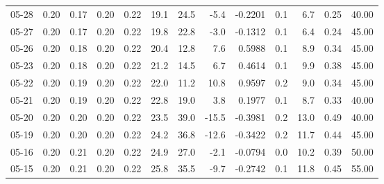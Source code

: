\begin{threeparttable}
{\begin{tabular}{lrrrrrrrrrrrr}
  05-28 &          0.20 &          0.17 &          0.20 &        0.22 &                19.1 &                24.5 &       -5.4 &      -0.2201 &                 0.1 &              6.7 &            0.25 &                  40.00 \\
  05-27 &          0.20 &          0.17 &          0.20 &        0.22 &                19.8 &                22.8 &       -3.0 &      -0.1312 &                 0.1 &              6.4 &            0.24 &                  45.00 \\
  05-26 &          0.20 &          0.18 &          0.20 &        0.22 &                20.4 &                12.8 &        7.6 &       0.5988 &                 0.1 &              8.9 &            0.34 &                  45.00 \\
  05-23 &          0.20 &          0.18 &          0.20 &        0.22 &                21.2 &                14.5 &        6.7 &       0.4614 &                 0.1 &              9.9 &            0.38 &                  45.00 \\
  05-22 &          0.20 &          0.19 &          0.20 &        0.22 &                22.0 &                11.2 &       10.8 &       0.9597 &                 0.2 &              9.0 &            0.34 &                  45.00 \\
  05-21 &          0.20 &          0.19 &          0.20 &        0.22 &                22.8 &                19.0 &        3.8 &       0.1977 &                 0.1 &              8.7 &            0.33 &                  40.00 \\
  05-20 &          0.20 &          0.20 &          0.20 &        0.22 &                23.5 &                39.0 &      -15.5 &      -0.3981 &                 0.2 &             13.0 &            0.49 &                  40.00 \\
  05-19 &          0.20 &          0.20 &          0.20 &        0.22 &                24.2 &                36.8 &      -12.6 &      -0.3422 &                 0.2 &             11.7 &            0.44 &                  45.00 \\
  05-16 &          0.20 &          0.21 &          0.20 &        0.22 &                24.9 &                27.0 &       -2.1 &      -0.0794 &                 0.0 &             10.2 &            0.39 &                  50.00 \\
  05-15 &          0.20 &          0.21 &          0.20 &        0.22 &                25.8 &                35.5 &       -9.7 &      -0.2742 &                 0.1 &             11.8 &            0.45 &                  55.00 \\

\end{tabular}}
\end{threeparttable}
